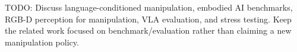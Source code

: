 TODO: Discuss language-conditioned manipulation, embodied AI benchmarks, RGB-D perception for manipulation, VLA evaluation, and stress testing. Keep the related work focused on benchmark/evaluation rather than claiming a new manipulation policy.
